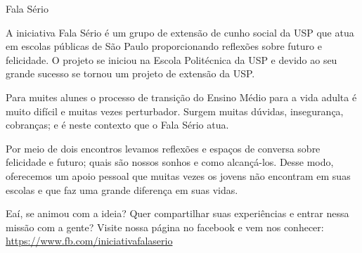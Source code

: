 \begin{subsecao}{Fala Sério}


A iniciativa Fala Sério é um grupo de extensão de cunho social da USP que atua em
escolas públicas de São Paulo proporcionando reflexões sobre futuro e felicidade.
O projeto se iniciou na Escola Politécnica da USP e devido ao seu grande sucesso 
se tornou um projeto de extensão da USP.

Para muites alunes o processo de transição do Ensino Médio para a vida adulta é 
muito difícil e muitas vezes perturbador. Surgem muitas dúvidas, insegurança, 
cobranças; e é neste contexto que o Fala Sério atua.

Por meio de dois encontros levamos reflexões e espaços de conversa sobre 
felicidade e futuro; quais são nossos sonhos e como alcançá-los. Desse modo, 
oferecemos um apoio pessoal que muitas vezes os jovens não encontram em suas 
escolas e que faz uma grande diferença em suas vidas.

Eaí, se animou com a ideia? Quer compartilhar suas experiências e entrar nessa 
missão com a gente? Visite nossa página no facebook e vem nos conhecer:
\url{https://www.fb.com/iniciativafalaserio}

\end{subsecao}
